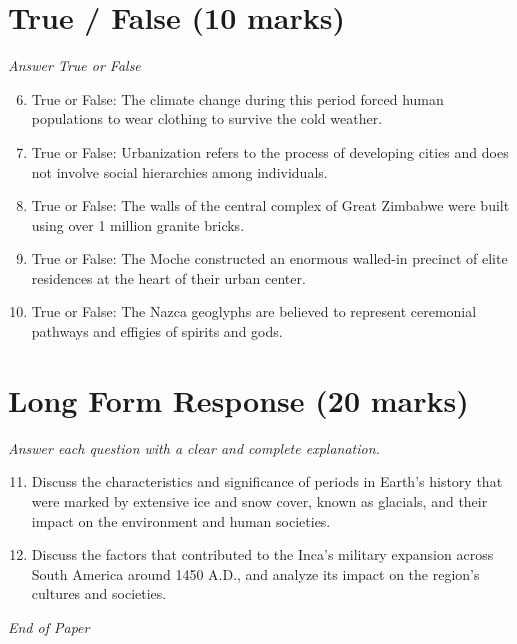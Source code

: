 \documentclass[12pt]{article}
\begin{document}
\section*{True / False (10 marks)}
\textit{Answer True or False}
\begin{enumerate}[label=\arabic*.]
\setcounter{enumi}{5}
\item True or False: The climate change during this period forced human populations to wear clothing to survive the cold weather.
\item True or False: Urbanization refers to the process of developing cities and does not involve social hierarchies among individuals.
\item True or False: The walls of the central complex of Great Zimbabwe were built using over 1 million granite bricks.
\item True or False: The Moche constructed an enormous walled-in precinct of elite residences at the heart of their urban center.
\item True or False: The Nazca geoglyphs are believed to represent ceremonial pathways and effigies of spirits and gods.
\end{enumerate}

\section*{Long Form Response (20 marks)}
\textit{Answer each question with a clear and complete explanation.}
\begin{enumerate}[label=\arabic*.]
\setcounter{enumi}{10}
\item Discuss the characteristics and significance of periods in Earth's history that were marked by extensive ice and snow cover, known as glacials, and their impact on the environment and human societies.
\item Discuss the factors that contributed to the Inca's military expansion across South America around 1450 A.D., and analyze its impact on the region's cultures and societies.
\end{enumerate}

\vfill
\noindent\textit{End of Paper}
\end{document}
